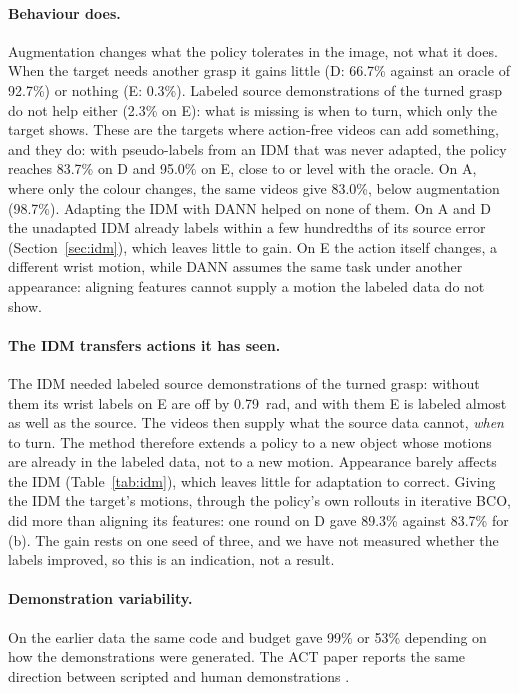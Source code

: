 \documentclass{article}
\begin{document}
\paragraph{Behaviour does.}
Augmentation changes what the policy tolerates in the image, not what it does. When the
target needs another grasp it gains little (D: 66.7\% against an oracle of 92.7\%) or
nothing (E: 0.3\%). Labeled source demonstrations of the turned grasp do not help
either (2.3\% on E): what is missing is when to turn, which only the target shows. These
are the targets where action-free videos can add something, and they do: with
pseudo-labels from an IDM that was never adapted, the policy reaches 83.7\% on D and
95.0\% on E, close to or level with the oracle. On A, where only the colour changes, the
same videos give 83.0\%, below augmentation (98.7\%). Adapting the IDM with DANN helped on
none of them. On A and D the unadapted IDM already labels within a few hundredths of its
source error (Section~\ref{sec:idm}), which leaves little to gain. On E the action itself
changes, a different wrist motion, while DANN assumes the same task under another
appearance: aligning features cannot supply a motion the labeled data do not show.

\paragraph{The IDM transfers actions it has seen.}
The IDM needed labeled source demonstrations of the turned grasp: without them its wrist
labels on E are off by 0.79~rad, and with them E is labeled almost as well as the source.
The videos then supply what the source data cannot, \emph{when} to turn. The method
therefore extends a policy to a new object whose motions are already in the labeled
data, not to a new motion. Appearance barely affects the IDM (Table~\ref{tab:idm}),
which leaves little for adaptation to correct. Giving the IDM the target's motions, through
the policy's own rollouts in iterative BCO, did more than aligning its features: one round
on D gave 89.3\% against 83.7\% for (b). The gain rests on one seed of three, and we have
not measured whether the labels improved, so this is an indication, not a result.

\paragraph{Demonstration variability.}
On the earlier data the same code and budget gave 99\% or 53\% depending on how the
demonstrations were generated. The ACT paper reports the same direction between scripted
and human demonstrations \citep{zhao2023act}.
\end{document}
